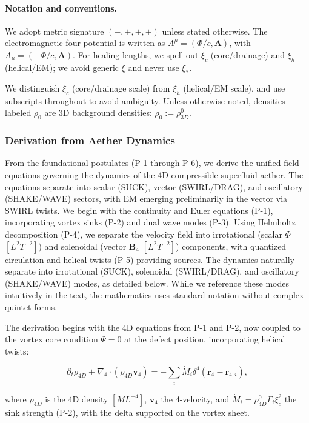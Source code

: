 \paragraph{Notation and conventions.}
We adopt metric signature $(-,+,+,+)$ unless stated otherwise.
The electromagnetic four-potential is written as $A^\mu=(\Phi/c,\mathbf A)$, with $A_\mu = (-\Phi/c,\mathbf A)$.
For healing lengths, we spell out $\xi_c$ (core/drainage) and $\xi_h$ (helical/EM); we avoid generic $\xi$ and never use $\xi_*$.

We distinguish $\xi_c$ (core/drainage scale) from $\xi_h$ (helical/EM scale), and use subscripts throughout to avoid ambiguity. Unless otherwise noted, densities labeled $\rho_0$ are 3D background densities: $\rho_0 := \rho_{3D}^0$.

\subsubsection{Derivation from Aether Dynamics}

From the foundational postulates (P-1 through P-6), we derive the unified field equations governing the dynamics of the 4D compressible superfluid aether. The equations separate into scalar (SUCK), vector (SWIRL/DRAG), and oscillatory (SHAKE/WAVE) sectors, with EM emerging preliminarily in the vector via SWIRL twists. We begin with the continuity and Euler equations (P-1), incorporating vortex sinks (P-2) and dual wave modes (P-3). Using Helmholtz decomposition (P-4), we separate the velocity field into irrotational (scalar $\Phi$ $[L^2 T^{-2}]$) and solenoidal (vector $\mathbf{B}_4$ $[L^2 T^{-2}]$) components, with quantized circulation and helical twists (P-5) providing sources. The dynamics naturally separate into irrotational (SUCK), solenoidal (SWIRL/DRAG), and oscillatory (SHAKE/WAVE) modes, as detailed below. While we reference these modes intuitively in the text, the mathematics uses standard notation without complex quintet forms.

The derivation begins with the 4D equations from P-1 and P-2, now coupled to the vortex core condition $\Psi=0$ at the defect position, incorporating helical twists:

\begin{equation}
\partial_t \rho_{4D} + \nabla_4 \cdot (\rho_{4D} \mathbf{v}_4) = -\sum_i \dot{M}_i \delta^4(\mathbf{r}_4 - \mathbf{r}_{4,i}),
\end{equation}

where $\rho_{4D}$ is the 4D density $[M L^{-4}]$, $\mathbf{v}_4$ the 4-velocity, and $\dot{M}_i = \rho_{4D}^0 \Gamma_i \xi_c^2$ the sink strength (P-2), with the delta supported on the vortex sheet.

